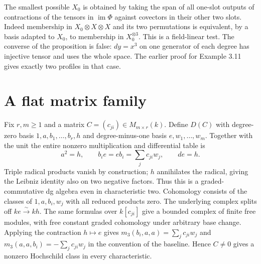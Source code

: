 \documentclass[11pt]{article}
\begin{document}
The smallest possible $X_0$ is obtained by taking the span of all
one-slot outputs of contractions of the tensors in $\operatorname{im}\Phi$
against covectors in their other two slots. Indeed membership in
$X_0\otimes X\otimes X$ and its two permutations is equivalent, by
a basis adapted to $X_0$, to membership in $X_0^{\otimes3}$.
This is a field-linear test. The converse of the proposition is false:
$dy=x^3$ on one generator of each degree has injective tensor and
uses the whole space. The earlier proof for Example 3.11 gives exactly
two profiles in that case.

\section{A flat matrix family}
Fix $r,m\ge1$ and a matrix $C=(c_{ji})\in M_{m\times r}(k)$. Define
$D(C)$ with degree-zero basis $1,a,b_1,\ldots,b_r,h$ and degree-minus-one
basis $e,w_1,\ldots,w_m$. Together with the unit the entire nonzero
multiplication and differential table is
\[
 a^2=h,\qquad b_i e=e b_i=\sum_j c_{ji}w_j,\qquad d e=h .
\]
Triple radical products vanish by construction; $h$ annihilates the
radical, giving the Leibniz identity also on two negative factors.
Thus this is a graded-commutative dg algebra even in characteristic two.
Cohomology consists of the classes of $1,a,b_i,w_j$ with all reduced
products zero. The underlying complex splits off $k e\xrightarrow{\sim}kh$.
The same formulas over $k[c_{ji}]$ give a bounded complex of finite
free modules, with free constant graded cohomology under arbitrary base
change. Applying the contraction $h\mapsto e$ gives
$m_3(b_i,a,a)=\sum_j c_{ji}w_j$ and
$m_3(a,a,b_i)=-\sum_j c_{ji}w_j$ in the convention of the baseline.
Hence $C\ne0$ gives a nonzero Hochschild class in every characteristic.
\end{document}
